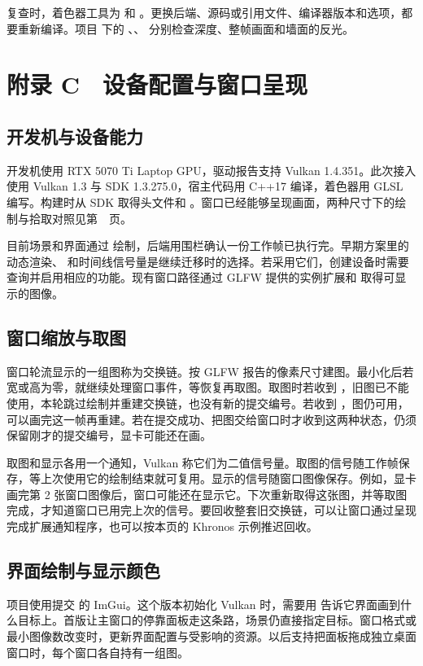 复查时，着色器工具为  和 。更换后端、源码或引用文件、编译器版本和选项，都要重新编译。项目  下的 、、 分别检查深度、整帧画面和墙面的反光。

\clearpage
\section{附录 C　设备配置与窗口呈现}\label{app:window}

\subsection{开发机与设备能力}
开发机使用 RTX 5070 Ti Laptop GPU，驱动报告支持 Vulkan 1.4.351。此次接入使用 Vulkan 1.3 与 SDK 1.3.275.0，宿主代码用 C++17 编译，着色器用 GLSL 编写。构建时从 SDK 取得头文件和 。窗口已经能够呈现画面，两种尺寸下的绘制与拾取对照见第~\pageref{impl:pixels}~页。

目前场景和界面通过  绘制，后端用围栏确认一份工作帧已执行完。早期方案里的动态渲染、 和时间线信号量是继续迁移时的选择。若采用它们，创建设备时需要查询并启用相应的功能。现有窗口路径通过 GLFW 提供的实例扩展和  取得可显示的图像。

\subsection{窗口缩放与取图}
窗口轮流显示的一组图称为交换链。按 GLFW 报告的像素尺寸建图。最小化后若宽或高为零，就继续处理窗口事件，等恢复再取图。取图时若收到 ，旧图已不能使用，本轮跳过绘制并重建交换链，也没有新的提交编号。若收到 ，图仍可用，可以画完这一帧再重建。若在提交成功、把图交给窗口时才收到这两种状态，仍须保留刚才的提交编号，显卡可能还在画。

取图和显示各用一个通知，Vulkan 称它们为二值信号量。取图的信号随工作帧保存，等上次使用它的绘制结束就可复用。显示的信号随窗口图像保存。例如，显卡画完第 2 张窗口图像后，窗口可能还在显示它。下次重新取得这张图，并等取图完成，才知道窗口已用完上次的信号。要回收整套旧交换链，可以让窗口通过呈现完成扩展通知程序，也可以按本页的 Khronos 示例推迟回收。

\subsection{界面绘制与显示颜色}
项目使用提交  的 ImGui。这个版本初始化 Vulkan 时，需要用  告诉它界面画到什么目标上。首版让主窗口的停靠面板走这条路，场景仍直接指定目标。窗口格式或最小图像数改变时，更新界面配置与受影响的资源。以后支持把面板拖成独立桌面窗口时，每个窗口各自持有一组图。

